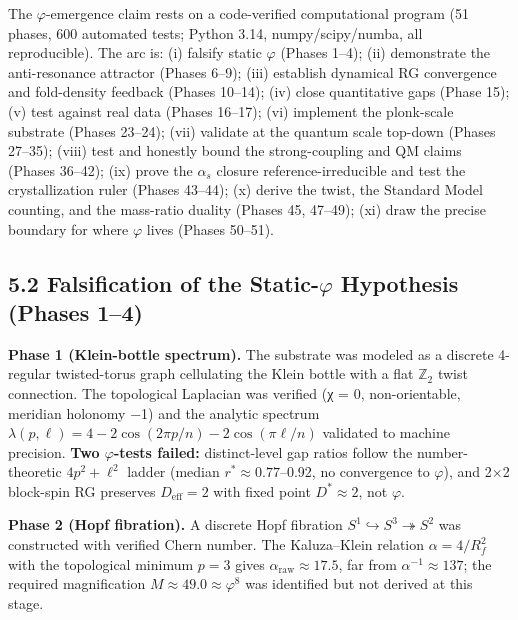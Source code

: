 \documentclass[
  11pt,
]{article}
\begin{document}
The \(\varphi\)-emergence claim rests on a code-verified computational
program (51 phases, 600 automated tests; Python 3.14, numpy/scipy/numba,
all reproducible). The arc is: (i) falsify static \(\varphi\) (Phases
1--4); (ii) demonstrate the anti-resonance attractor (Phases 6--9);
(iii) establish dynamical RG convergence and fold-density feedback
(Phases 10--14); (iv) close quantitative gaps (Phase 15); (v) test
against real data (Phases 16--17); (vi) implement the plonk-scale
substrate (Phases 23--24); (vii) validate at the quantum scale top-down
(Phases 27--35); (viii) test and honestly bound the strong-coupling and
QM claims (Phases 36--42); (ix) prove the \(\alpha_s\) closure
reference-irreducible and test the crystallization ruler (Phases
43--44); (x) derive the twist, the Standard Model counting, and the
mass-ratio duality (Phases 45, 47--49); (xi) draw the precise boundary
for where \(\varphi\) lives (Phases 50--51).

\subsection{\texorpdfstring{5.2 Falsification of the Static-\(\varphi\)
Hypothesis (Phases
1--4)}{5.2 Falsification of the Static-\textbackslash varphi Hypothesis (Phases 1--4)}}\label{falsification-of-the-static-varphi-hypothesis-phases-14}

\textbf{Phase 1 (Klein-bottle spectrum).} The substrate was modeled as a
discrete 4-regular twisted-torus graph cellulating the Klein bottle with
a flat \(\mathbb{Z}_2\) twist connection. The topological Laplacian was
verified (χ = 0, non-orientable, meridian holonomy −1) and the analytic
spectrum \(\lambda(p,\ell) = 4 - 2\cos(2\pi p/n) - 2\cos(\pi\ell/n)\)
validated to machine precision. \textbf{Two \(\varphi\)-tests failed:}
distinct-level gap ratios follow the number-theoretic \(4p^2 + \ell^2\)
ladder (median \(r^* \approx 0.77\)--0.92, no convergence to
\(\varphi\)), and 2×2 block-spin RG preserves \(D_{\text{eff}} = 2\)
with fixed point \(D^* \approx 2\), not \(\varphi\).

\textbf{Phase 2 (Hopf fibration).} A discrete Hopf fibration
\(S^1 \hookrightarrow S^3 \twoheadrightarrow S^2\) was constructed with
verified Chern number. The Kaluza--Klein relation \(\alpha = 4/R_f^2\)
with the topological minimum \(p = 3\) gives
\(\alpha_{\text{raw}} \approx 17.5\), far from
\(\alpha^{-1} \approx 137\); the required magnification
\(M \approx 49.0 \approx \varphi^8\) was identified but not derived at
this stage.
\end{document}

